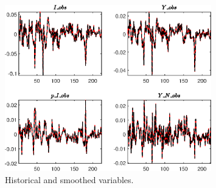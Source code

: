  
\begin{figure}[H]
\centering 
\includegraphics[width=0.80\textwidth]{BRS_growth_id/graphs/BRS_growth_id_HistoricalAndSmoothedVariables1}
\caption{Historical and smoothed variables.}\label{Fig:HistoricalAndSmoothedVariables:1}
\end{figure}


